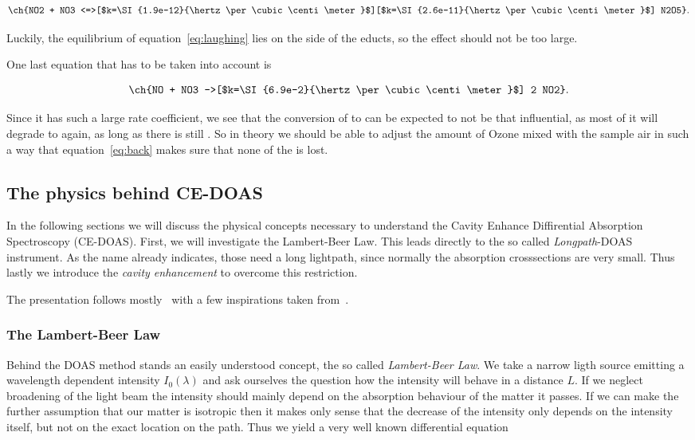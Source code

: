 \begin{align}
  \ch{NO2 + NO3
  <=>[$k=\SI{1.9e-12}{\hertz\per\cubic\centi\meter}$][$k=\SI{2.6e-11}{\hertz\per\cubic\centi\meter}$] N2O5}. \label{eq:laughing}
\end{align}

Luckily, the equilibrium of equation~\eqref{eq:laughing} lies on the
side of the educts, so the effect should not be too large.

One last equation that has to be taken into account is

\begin{align}
  \ch{NO + NO3 ->[$k=\SI{6.9e-2}{\hertz\per\cubic\centi\meter}$] 2 NO2}.\label{eq:back}
\end{align}

Since it has such a large rate coefficient, we see that the conversion
of  to  can be expected to not be that influential, as
most of it will degrade to  again, as long as there is still
. So in theory we should be able to adjust the amount of Ozone
mixed with the sample air in such a way that equation~\eqref{eq:back}
makes sure that none of the  is lost.


\subsection{The physics behind CE-DOAS}
\label{sec:ce-doas-physics}

In the following sections we will discuss the physical concepts
necessary to understand the Cavity Enhance Diffirential Absorption
Spectroscopy (CE-DOAS). First, we will investigate the Lambert-Beer
Law. This leads directly to the so called \emph{Longpath}-DOAS
instrument. As the name already indicates, those need a long
lightpath, since normally the absorption crosssections are very
small. Thus lastly we introduce the \emph{cavity enhancement} to
overcome this restriction.

The presentation follows mostly~\cite{fp58} with a few inspirations
taken from~\cite{platt2008differential}.

\subsubsection{The Lambert-Beer Law}
\label{sec:lambert-beer}

Behind the DOAS method stands an easily understood concept, the so
called \emph{Lambert-Beer Law}. We take a narrow ligth source emitting a
wavelength dependent intensity $I_0(\lambda)$ and ask ourselves the
question how the intensity will behave in a distance $L$. If we
neglect broadening of the light beam the intensity should mainly
depend on the absorption behaviour of the matter it passes. If we can
make the further assumption that our matter is isotropic then it makes
only sense that the decrease of the intensity only depends on the
intensity itself, but not on the exact location on the path. Thus we
yield a very well known differential equation

